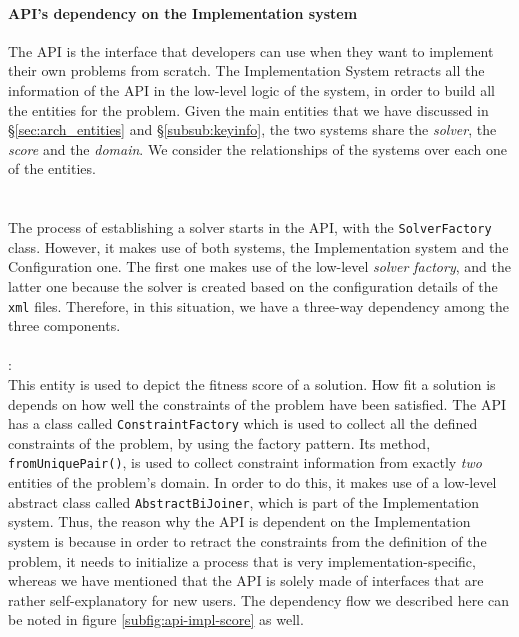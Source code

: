 \paragraph{API's dependency on the Implementation system}
The API is the interface that developers can use when they want to implement their own problems from scratch. The Implementation System retracts all the information of the API in the low-level logic of the system, in order to build all the entities for the problem. Given the main entities that we have discussed in \S\ref{sec:arch_entities} and \S\ref{subsub:keyinfo}, the two systems share the \textit{solver}, the \textit{score} and the \textit{domain}. We consider the relationships of the systems over each one of the entities. \\\\
\\
The process of establishing a solver starts in the API, with the \verb!SolverFactory! class. However, it makes use of both systems, the Implementation system and the Configuration one. The first one makes use of the low-level \textit{solver factory}, and the latter one because the solver is created based on the configuration details of the \verb!xml! files. Therefore, in this situation, we have a three-way dependency among the three components.\\\\
:\\
This entity is used to depict the fitness score of a solution. How fit a solution is depends on how well the constraints of the problem have been satisfied. The API has a class called \verb!ConstraintFactory! which is used to collect all the defined constraints of the problem, by using the factory pattern. Its method, \verb!fromUniquePair()!, is used to collect constraint information from exactly \textit{two} entities of the problem's domain. In order to do this, it makes use of a low-level abstract class called \verb!AbstractBiJoiner!, which is part of the Implementation system. Thus, the reason why the API is dependent on the Implementation system is because in order to retract the constraints from the definition of the problem, it needs to initialize a process that is very implementation-specific, whereas we have mentioned that the API is solely made of interfaces that are rather self-explanatory for new users. The dependency flow we described here can be noted in figure \ref{subfig:api-impl-score} as well.\\\\
\\
